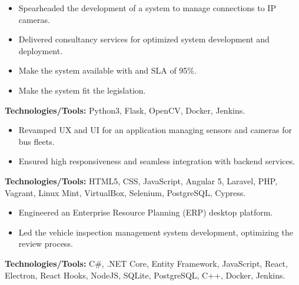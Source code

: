\documentclass[10pt,a4paper]{altacv}
\begin{document}
\vspace{5mm}

\begin{itemize}
    \setlength{\itemindent}{0.5em}
    \item[--] Spearheaded the development of a system to manage connections to IP cameras.
    \item[--] Delivered consultancy services for optimized system development and deployment.
    \item[--] Make the system available with and SLA of 95\%.
    \item[--] Make the system fit the legislation.
\end{itemize}
\textbf{Technologies/Tools:} Python3, Flask, OpenCV, Docker, Jenkins.
\vspace{5mm}

\begin{itemize}
    \setlength{\itemindent}{0.5em}
    \item[--] Revamped UX and UI for an application managing sensors and cameras for bus fleets.
    \item[--] Ensured high responsiveness and seamless integration with backend services.
\end{itemize}
\textbf{Technologies/Tools:} HTML5, CSS, JavaScript, Angular 5, Laravel, PHP, Vagrant, Linux Mint, VirtualBox, Selenium, PostgreSQL, Cypress.
\vspace{5mm}

\begin{itemize}
    \setlength{\itemindent}{0.5em}
    \item[--] Engineered an Enterprise Resource Planning (ERP) desktop platform.
    \item[--] Led the vehicle inspection management system development, optimizing the review process.
\end{itemize}
\textbf{Technologies/Tools:} C\#, .NET Core, Entity Framework, JavaScript, React, Electron, React Hooks, NodeJS, SQLite, PostgreSQL, C++, Docker, Jenkins.
\vspace{5mm}
\end{document}
